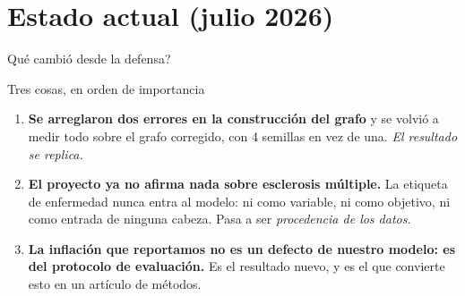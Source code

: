 %
%
%

\section{Estado actual (julio 2026)}

\begin{frame}{\textquestiondown{}Qu\'e cambi\'o desde la defensa?}
  \begin{block}{Tres cosas, en orden de importancia}
    \small
    \begin{enumerate}
      \item<1-> \textbf{Se arreglaron dos errores en la construcci\'on del grafo} y se
            volvi\'o a medir todo sobre el grafo corregido, con 4 semillas en vez de una.
            \emph{El resultado se replica.}
      \item<2-> \textbf{El proyecto ya no afirma nada sobre esclerosis m\'ultiple.} La
            etiqueta de enfermedad nunca entra al modelo: ni como variable, ni como
            objetivo, ni como entrada de ninguna cabeza. Pasa a ser \emph{procedencia
            de los datos}.
      \item<3-> \textbf{La inflaci\'on que reportamos no es un defecto de nuestro modelo:
            es del protocolo de evaluaci\'on.} Es el resultado nuevo, y es el que
            convierte esto en un art\'iculo de m\'etodos.
    \end{enumerate}
  \end{block}

\end{frame}

